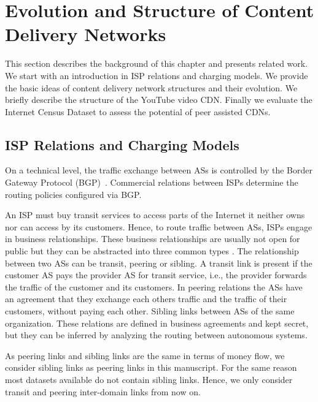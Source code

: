\section{Evolution and Structure of Content Delivery Networks}\label{sec:aslevel:background}

This section describes the background of this chapter and presents related work.
We start with an introduction in ISP relations and charging models.
We provide the basic ideas of content delivery network structures and their evolution.
We briefly describe the structure of the YouTube video CDN.
Finally we evaluate the Internet Census Dataset to assess the potential of peer assisted CDNs.

\subsection{ISP Relations and Charging Models}

On a technical level, the traffic exchange between ASs is controlled by the Border Gateway Protocol (BGP)~\cite{trangia2009}. Commercial relations between ISPs determine the routing policies configured via BGP.

An ISP must buy transit services to access parts of the Internet it neither owns nor can access by its customers.
Hence, to route traffic between ASs, ISPs engage in business relationships.
These business relationships are usually not open for public but they can be abstracted into three common types \cite{gao2001}.
The relationship between two ASs can be transit, peering or sibling.
A transit link is present if the customer AS pays the provider AS for transit service, i.e., the provider forwards the traffic of the customer and its customers.
In peering relations the ASs have an agreement that they exchange each others traffic and the traffic of their customers, without paying each other.
Sibling links between ASs of the same organization. These relations are defined in business agreements and kept secret, but they can be inferred by analyzing the routing between autonomous systems.

As peering links and sibling links are the same in terms of money flow, we consider sibling links as peering links in this manuscript. For the same reason most datasets available do not contain sibling links.
Hence, we only consider transit and peering inter-domain links from now on.

